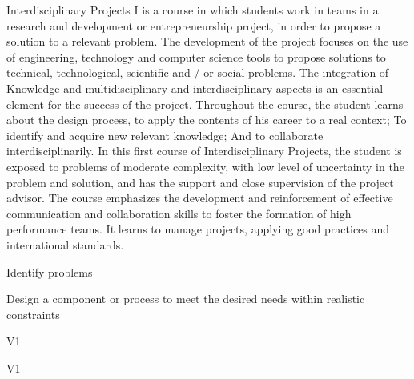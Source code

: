 \begin{syllabus}


\begin{justification}
Interdisciplinary Projects I is a course in which students work in teams in a research and development or entrepreneurship project, in order to propose a solution to a relevant problem. The development of the project focuses on the use of engineering, technology and computer science tools to propose solutions to technical, technological, scientific and / or social problems. The integration of
Knowledge and multidisciplinary and interdisciplinary aspects is an essential element for the success of the project. Throughout the course, the student learns about the design process, to apply the contents of his career to a real context; To identify and acquire new relevant knowledge; And to collaborate interdisciplinarily. In this first course of Interdisciplinary Projects, the student is exposed to problems of moderate complexity, with low level of uncertainty in the problem and solution, and has the support and close supervision of the project advisor. The course emphasizes the development and reinforcement of effective communication and collaboration skills to foster the formation of high performance teams.
It learns to manage projects, applying good practices and international standards.
\end{justification}

\begin{goals}
   \item Identify problems
   \item Design a component or process to meet the desired needs within realistic constraints
   
\end{goals}

\begin{outcomes}{V1}
   \item {}
   \item {}
\end{outcomes}

\begin{competences}{V1}
    \item {}
    \item {}
\end{competences}


\end{syllabus}
